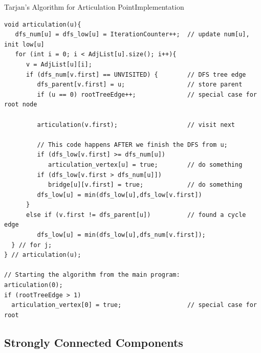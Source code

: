 \begin{frame}[fragile]{Tarjan's Algorithm for Articulation Point}{Implementation}
{\tiny
  \begin{exampleblock}{}
\begin{verbatim}
void articulation(u){
   dfs_num[u] = dfs_low[u] = IterationCounter++;  // update num[u], init low[u]
   for (int i = 0; i < AdjList[u].size(); i++){
      v = AdjList[u][i];
      if (dfs_num[v.first] == UNVISITED) {        // DFS tree edge
         dfs_parent[v.first] = u;                 // store parent
         if (u == 0) rootTreeEdge++;              // special case for root node

         articulation(v.first);                   // visit next

         // This code happens AFTER we finish the DFS from u;
         if (dfs_low[v.first] >= dfs_num[u])
            articulation_vertex[u] = true;        // do something
         if (dfs_low[v.first > dfs_num[u]])
            bridge[u][v.first] = true;            // do something
         dfs_low[u] = min(dfs_low[u],dfs_low[v.first])
      }
      else if (v.first != dfs_parent[u])          // found a cycle edge
         dfs_low[u] = min(dfs_low[u],dfs_num[v.first]);
  } // for j;
} // articulation(u);

// Starting the algorithm from the main program:
articulation(0);
if (rootTreeEdge > 1)
  articulation_vertex[0] = true;                  // special case for root
\end{verbatim}
  \end{exampleblock}}
\end{frame}

\subsection{Strongly Connected Components}

